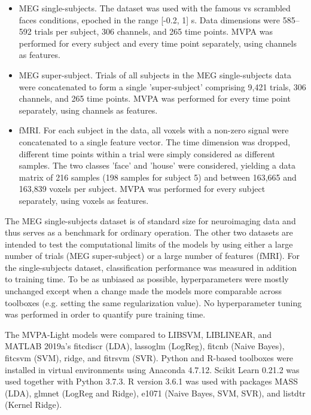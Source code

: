 \documentclass[utf8]{frontiersSCNS} %
\begin{document}
\begin{itemize}
    \item MEG single-subjects. The \cite{Wakeman2015ADataset} dataset was used with the famous vs scrambled faces conditions, epoched in the range [-0.2, 1] s. Data dimensions were 585--592 trials per subject, 306 channels, and 265 time points. MVPA was performed for every subject and every time point separately, using channels as features.
    \item MEG super-subject. Trials of all subjects in the MEG single-subjects data were concatenated to form a single 'super-subject' comprising 9,421 trials, 306 channels, and 265 time points. MVPA was performed for every time point separately, using channels as features.
    \item fMRI. For each subject in the \cite{Haxby2001} data, all voxels with a non-zero signal were concatenated to a single feature vector. The time dimension was dropped, different time points within a trial were simply considered as different samples. The two classes 'face' and 'house' were considered, yielding a data matrix of 216 samples (198 samples for subject 5) and between 163,665 and 163,839 voxels per subject. MVPA was performed for every subject separately, using voxels as features.
\end{itemize}

The MEG single-subjects dataset is of standard size for neuroimaging data and thus serves as a benchmark for ordinary operation. The other two datasets are intended to test the computational limits of the models by using either a large number of trials (MEG super-subject) or a large number of features (fMRI). For the single-subjects dataset, classification performance was measured in addition to training time.
To be as unbiased as possible, hyperparameters were mostly unchanged except when a change made the models more comparable across toolboxes (e.g. setting the same regularization value). No hyperparameter tuning was performed in order to quantify pure training time.

The MVPA-Light models were compared to LIBSVM,  LIBLINEAR, and MATLAB 2019a's fitcdiscr (LDA), lassoglm (LogReg), fitcnb (Naive Bayes), fitcsvm (SVM), ridge, and fitrsvm (SVR). Python and R-based toolboxes were installed in virtual environments using Anaconda 4.7.12. Scikit Learn 0.21.2 was used together with Python 3.7.3. R version 3.6.1 was used with packages MASS (LDA), glmnet (LogReg and Ridge), e1071 (Naive Bayes, SVM, SVR), and listdtr (Kernel Ridge).
\end{document}
